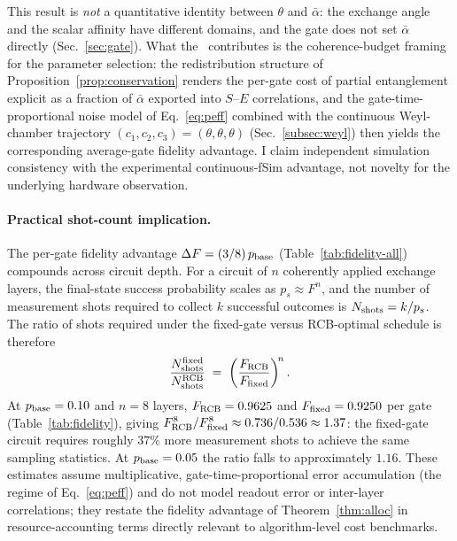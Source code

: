 This result is \emph{not} a quantitative identity between $\theta$ and
$\bar\alpha$: the exchange angle and the scalar affinity have different
domains, and the gate does not set $\bar\alpha$ directly
(Sec.~\ref{sec:gate}).
What the \RCF~contributes is the coherence-budget framing for the
parameter selection: the redistribution structure of
Proposition~\ref{prop:conservation} renders the per-gate cost of
partial entanglement explicit as a fraction of $\bar\alpha$ exported into
$S$--$E$ correlations, and the gate-time-proportional noise model of
Eq.~\eqref{eq:peff} combined with the continuous Weyl-chamber
trajectory $(c_1,c_2,c_3)=(\theta,\theta,\theta)$
(Sec.~\ref{subsec:weyl}) then yields the corresponding average-gate
fidelity advantage.
I claim independent simulation consistency with the experimental
continuous-fSim advantage, not novelty for the underlying hardware
observation.

\paragraph{Practical shot-count implication.}
The per-gate fidelity advantage $\Delta F = (3/8)\,p_{\rm base}$
(Table~\ref{tab:fidelity-all}) compounds across circuit depth.
For a circuit of $n$ coherently applied exchange layers, the
final-state success probability scales as $p_s \approx F^n$, and the
number of measurement shots required to collect $k$ successful
outcomes is $N_{\rm shots} = k/p_s$.
The ratio of shots required under the fixed-gate versus RCB-optimal
schedule is therefore
%
\begin{equation}
\label{eq:shot-ratio}
\frac{N_{\rm shots}^{\rm fixed}}{N_{\rm shots}^{\rm RCB}}
  \;=\; \left(\frac{F_{\rm RCB}}{F_{\rm fixed}}\right)^{\!n}.
\end{equation}
%
At $p_{\rm base} = 0.10$ and $n = 8$ layers,
$F_{\rm RCB} = 0.9625$ and $F_{\rm fixed} = 0.9250$ per gate
(Table~\ref{tab:fidelity}), giving $F_{\rm RCB}^8 / F_{\rm fixed}^8
\approx 0.736 / 0.536 \approx 1.37$: the fixed-gate circuit requires
roughly $37\%$ more measurement shots to achieve the same sampling
statistics.
At $p_{\rm base} = 0.05$ the ratio falls to approximately $1.16$.
These estimates assume multiplicative, gate-time-proportional error
accumulation (the regime of Eq.~\eqref{eq:peff}) and do not model
readout error or inter-layer correlations; they restate the fidelity
advantage of Theorem~\ref{thm:alloc} in resource-accounting terms
directly relevant to algorithm-level cost benchmarks.

